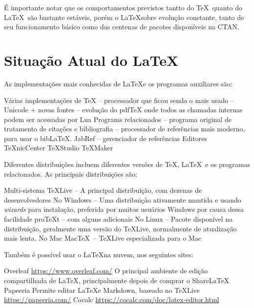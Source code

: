 É importante notar que os comportamentos previstos tantto do \TeX\  quanto do \LaTeX\  são bastante estáveis, porém o \LaTeX  sobre evolução constante, tanto de seu funcionamento básico como das centenas de pacotes disponíveis na CTAN.

\section{Situação Atual do \LaTeX}

As implementações mais conhecidas de \LaTeX e os programas auxiliares são:
\begin{outline}
\1 Várias implementações de \TeX
    \2  -- processador que ficou sendo o mais usado
    \2   -- Unicode + novas fontes
    \2  -- evolução do pdfTeX onde todos as chamadas internas podem ser acessadas por Lua 
\1 Programs relacionados
    \2  -- programa original de tratamento de citações e bibliografia
    \2  -- processador de referências mais moderno, para usar o bib\LaTeX.
    \2 JabRef -- gerenciador de referências
\1 Editores
    \2 \TeX nicCenter
    \2 \TeX Studio 
    \2 \TeX Maker 
\end{outline}
    
    
Diferentes distribuições incluem diferentes versões de \TeX, \LaTeX\  
e os programas relacionados. As principais distribuições são:

\begin{outline}
    \1 Multi-sistema
    \2 \TeX  Live --
    A principal distribuição, com dezenas de desenvolvedores
    \1 No Windows
    \2  --
    Uma distribuição ativamente mantida e usando \textit{wizards} para instalação, 
    preferida por muitos usuários Windows por causa dessa facilidade
    \2 pro\TeX t  -- \hologo{MiKTeX} com alguns adicionais
    \1 No Linux
--    \2 Pacote disponível na distribuição, geralmente uma versão do \TeX  Live, normalmente de atualização mais lenta.
    \1 No Mac
    \2 Mac\TeX\  -- \TeX  Live  especializada para o Mac
\end{outline}


Também é possível usar o \LaTeX  na nuvem, nos seguintes sites:
\begin{outline}
    \1 Overleaf
    \2 \url{https://www.overleaf.com/}
    \2 O principal ambiente de edição compartilhada de \LaTeX, principalmente
    depois de comprar o Share\LaTeX  
    \1 Papeeria
    \2 Permite editar \LaTeX  e Markdown, baseado no \TeX  Live
    \2 \url{https://papeeria.com/}
    \1 Cocalc
    \2 \url{https://cocalc.com/doc/latex-editor.html}
\end{outline}
    
